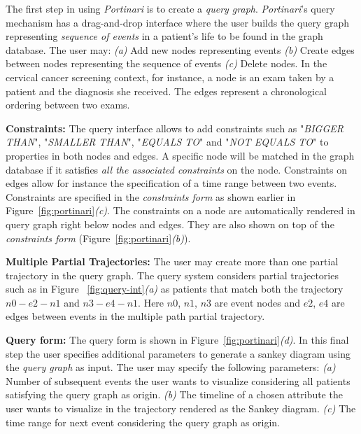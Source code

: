 \documentclass[10pt, conference]{IEEEtran}
\begin{document}
The first step in using \textit{Portinari} is to create a \emph{query graph}. \textit{Portinari}'s query mechanism  has a drag-and-drop interface where the user builds the query graph representing \emph{sequence of events} in a patient's life to be found in the graph database.  
The user may: 
\textit{(a)} Add new nodes representing events
\textit{(b)} Create edges between nodes representing the sequence of events
\textit{(c)} Delete nodes.
In the cervical cancer screening context,  for instance, a node is an exam taken by a patient and the diagnosis she received. The edges represent a chronological ordering between two exams. 


\noindent \textbf{Constraints:} The query interface allows to add constraints such as "\textit{BIGGER THAN}", "\textit{SMALLER THAN}", "\textit{EQUALS TO}" and "\textit{NOT EQUALS TO}" to properties in both nodes and edges. A specific node will be matched in the graph database if it satisfies \emph{all the associated constraints} on the node. Constraints on edges allow for instance the specification of a time range between two events.
Constraints are specified in the \textit{constraints form} as shown earlier in Figure~\ref{fig:portinari}\textit{(c)}. The constraints on a node are automatically rendered in query graph right below nodes and edges. They are also shown on top  of the \textit{constraints form} (Figure~\ref{fig:portinari}\textit{(b)}).



\noindent \textbf{Multiple Partial Trajectories:} The user may create more than one partial trajectory in the query graph. The query system considers  partial trajectories such as in Figure ~\ref{fig:query-int}\textit{(a)} as patients that match both the trajectory $n0-e2-n1$ and $n3-e4-n1$. Here $n0$, $n1$, $n3$ are event nodes and $e2$, $e4$ are edges between events in the multiple path partial trajectory.

\noindent \textbf{Query form:} The query form is shown in Figure~\ref{fig:portinari}\textit{(d)}. In this final step  the user specifies additional parameters to generate a sankey diagram using the \textit{query graph} as input. The user may specify the following parameters:
\textit{(a)} Number of subsequent events the user wants to visualize considering all patients satisfying the query graph as origin.
\textit{(b)} The timeline of a chosen attribute the user wants to visualize in the trajectory rendered as the Sankey diagram.
\textit{(c)} The time range for next event considering the query graph as origin. 
\end{document}

